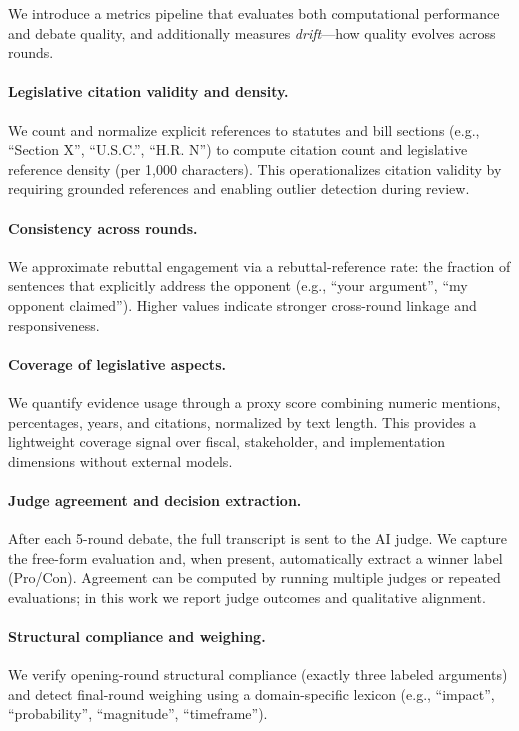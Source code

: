 \documentclass{article}
\begin{document}
We introduce a metrics pipeline that evaluates both computational performance and debate quality, and additionally measures \emph{drift}—how quality evolves across rounds.

\paragraph{Legislative citation validity and density.} We count and normalize explicit references to statutes and bill sections (e.g., ``Section X'', ``U.S.C.'', ``H.R. N'') to compute citation count and legislative reference density (per 1{,}000 characters). This operationalizes citation validity by requiring grounded references and enabling outlier detection during review.

\paragraph{Consistency across rounds.} We approximate rebuttal engagement via a rebuttal-reference rate: the fraction of sentences that explicitly address the opponent (e.g., ``your argument'', ``my opponent claimed''). Higher values indicate stronger cross-round linkage and responsiveness.

\paragraph{Coverage of legislative aspects.} We quantify evidence usage through a proxy score combining numeric mentions, percentages, years, and citations, normalized by text length. This provides a lightweight coverage signal over fiscal, stakeholder, and implementation dimensions without external models.

\paragraph{Judge agreement and decision extraction.} After each 5-round debate, the full transcript is sent to the AI judge. We capture the free-form evaluation and, when present, automatically extract a winner label (Pro/Con). Agreement can be computed by running multiple judges or repeated evaluations; in this work we report judge outcomes and qualitative alignment.

\paragraph{Structural compliance and weighing.} We verify opening-round structural compliance (exactly three labeled arguments) and detect final-round weighing using a domain-specific lexicon (e.g., ``impact'', ``probability'', ``magnitude'', ``timeframe'').
\end{document}
